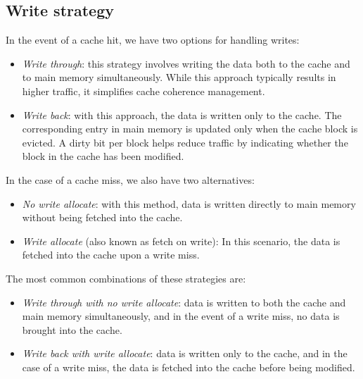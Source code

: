 \subsection{Write strategy}
In the event of a cache hit, we have two options for handling writes:
\begin{itemize}
    \item \textit{Write through}: this strategy involves writing the data both to the cache and to main memory simultaneously. 
        While this approach typically results in higher traffic, it simplifies cache coherence management.
    \item \textit{Write back}: with this approach, the data is written only to the cache. 
        The corresponding entry in main memory is updated only when the cache block is evicted. 
        A dirty bit per block helps reduce traffic by indicating whether the block in the cache has been modified.
\end{itemize}
In the case of a cache miss, we also have two alternatives:
\begin{itemize}
    \item \textit{No write allocate}: with this method, data is written directly to main memory without being fetched into the cache.
    \item \textit{Write allocate} (also known as fetch on write): In this scenario, the data is fetched into the cache upon a write miss.
\end{itemize}
The most common combinations of these strategies are:
\begin{itemize}
    \item \textit{Write through with no write allocate}: data is written to both the cache and main memory simultaneously, and in the event of a write miss, no data is brought into the cache.
    \item \textit{Write back with write allocate}: data is written only to the cache, and in the case of a write miss, the data is fetched into the cache before being modified.
\end{itemize}